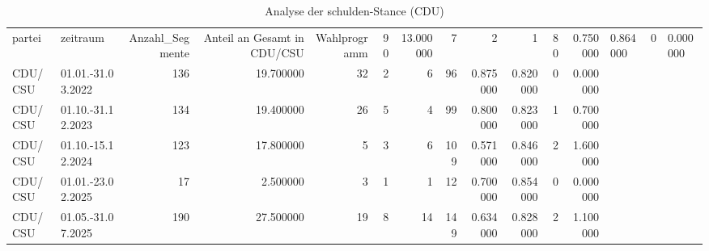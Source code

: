 \begin{table}
\caption{Analyse der schulden-Stance (CDU)}
\label{tab:meine_tabelle}
\begin{tabular}{llrrrrrrrrrr}
\toprule
partei & zeitraum & Anzahl_Segmente & Anteil an Gesamt in %
\midrule
CDU/CSU & Wahlprogramm & 90 & 13.000000 & 7 & 2 & 1 & 80 & 0.750000 & 0.864000 & 0 & 0.000000 \\
CDU/CSU & 01.01.-31.03.2022 & 136 & 19.700000 & 32 & 2 & 6 & 96 & 0.875000 & 0.820000 & 0 & 0.000000 \\
CDU/CSU & 01.10.-31.12.2023 & 134 & 19.400000 & 26 & 5 & 4 & 99 & 0.800000 & 0.823000 & 1 & 0.700000 \\
CDU/CSU & 01.10.-15.12.2024 & 123 & 17.800000 & 5 & 3 & 6 & 109 & 0.571000 & 0.846000 & 2 & 1.600000 \\
CDU/CSU & 01.01.-23.02.2025 & 17 & 2.500000 & 3 & 1 & 1 & 12 & 0.700000 & 0.854000 & 0 & 0.000000 \\
CDU/CSU & 01.05.-31.07.2025 & 190 & 27.500000 & 19 & 8 & 14 & 149 & 0.634000 & 0.828000 & 2 & 1.100000 \\
\bottomrule
\end{tabular}
\end{table}
